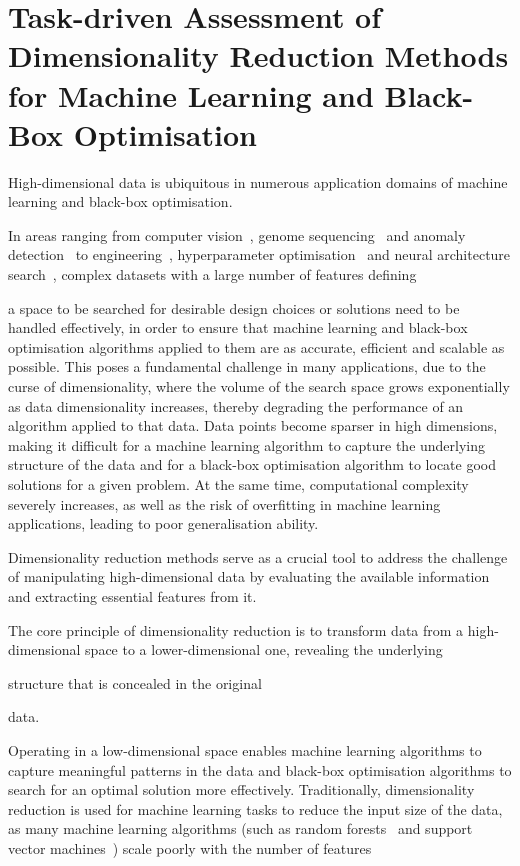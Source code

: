 \chapter{Task-driven Assessment of Dimensionality Reduction Methods for Machine Learning and Black-Box Optimisation}\label{ch:ch04:dim_red}

High-dimensional data is ubiquitous in numerous application domains of machine learning and black-box optimisation.


In areas ranging from computer vision~\citep{SchEtAl15}, genome sequencing~\citep{VanEtAl22} and anomaly detection~\citep{TalEtAl21} to engineering~\citep{PreEtAl24}, hyperparameter optimisation~\citep{SehEtAl22} and neural architecture search~\citep{ElsEtAl19}, complex datasets with a large number of features defining 

a space to be searched for desirable design choices or solutions 
need to be handled effectively, in order to ensure that machine learning and  black-box optimisation algorithms applied to them are as accurate, efficient and scalable as possible. 
This poses a fundamental challenge in many applications, due to the curse of dimensionality, where the volume of the search space grows exponentially as data dimensionality increases, thereby degrading the performance of an algorithm applied to that data.
Data points become sparser in high dimensions, making it difficult for a machine learning algorithm to capture the underlying structure of the data and for a  black-box optimisation algorithm to locate good solutions for a given problem. 
At the same time, computational complexity severely increases, as well as the risk of overfitting in machine learning applications, leading to poor generalisation ability.

Dimensionality reduction methods serve as a crucial tool to address the challenge of manipulating high-dimensional data by evaluating the available information and extracting essential features from it.

The core principle of dimensionality reduction is to transform data from a high-dimensional space to a lower-dimensional one, revealing the underlying 

structure that is concealed in the original

data. 

Operating in a low-dimensional space enables machine learning algorithms to capture meaningful patterns in the data and  black-box optimisation algorithms to search for an optimal solution more effectively.
Traditionally, dimensionality reduction is used for machine learning tasks to reduce the input size of the data, as many machine learning algorithms (such as random forests~\citep{Breiman01} and support vector machines~\citep{CorVap95}) scale poorly with the number of features 

